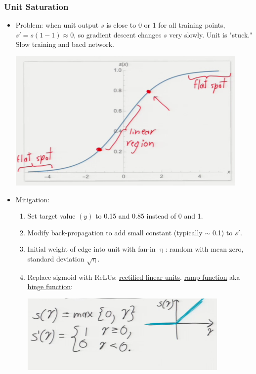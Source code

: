 \documentclass[10pt]{article}
\begin{document}
\begin{itemize}
	\newpage
	\subsubsection*{Unit Saturation}
	\begin{itemize}
		\item Problem: when unit output $s$ is close to 0 or 1 for all training points, $s' = s(1-1) \approx 0$, so gradient descent changes $s$ very slowly. Unit is "stuck." Slow training and bacd network.
		\begin{center}
			\includegraphics[scale=0.7]{../images/unitsaturation}
		\end{center}
		\item Mitigation: 
			\begin{enumerate}
				\item Set target value $(y)$ to 0.15 and 0.85 instead of 0 and 1.
				\item Modify back-propagation to add small constant (typically $\sim$ 0.1) to $s'$.
				\item Initial weight of edge into unit with fan-in $\upeta$: random with mean zero, standard deviation $\sqrt{\upeta}$.
				\item Replace sigmoid with ReLUs: \underline{rectified linear units}. \underline{ramp function} aka \underline{hinge function}:
				\begin{center}
					\includegraphics[scale=0.7]{../images/hinge}
				\end{center}
			\end{enumerate}
	\end{itemize}
	

\end{itemize}
\end{document}
